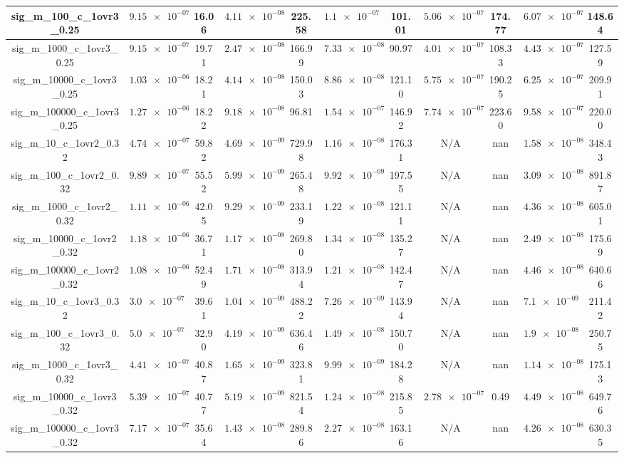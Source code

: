 \documentclass{article}%
\begin{document}
\begin{tabular}{|c||c|c|c|c|c|c|c|c|c|c|}
\hline%
sig\_m\_100\_c\_1ovr3\_0.25&$\num{9.15e-07}$&16.06&$\num{4.11e-08}$&225.58&$\num{1.1e-07}$&101.01&$\num{5.06e-07}$&174.77&$\num{6.07e-07}$&148.64\\%
\hline%
sig\_m\_1000\_c\_1ovr3\_0.25&$\num{9.15e-07}$&19.71&$\num{2.47e-08}$&166.99&$\num{7.33e-08}$&90.97&$\num{4.01e-07}$&108.33&$\num{4.43e-07}$&127.59\\%
\hline%
sig\_m\_10000\_c\_1ovr3\_0.25&$\num{1.03e-06}$&18.21&$\num{4.14e-08}$&150.03&$\num{8.86e-08}$&121.10&$\num{5.75e-07}$&190.25&$\num{6.25e-07}$&209.91\\%
\hline%
sig\_m\_100000\_c\_1ovr3\_0.25&$\num{1.27e-06}$&18.22&$\num{9.18e-08}$&96.81&$\num{1.54e-07}$&146.92&$\num{7.74e-07}$&223.60&$\num{9.58e-07}$&220.00\\%
\hline%
sig\_m\_10\_c\_1ovr2\_0.32&$\num{4.74e-07}$&59.82&$\num{4.69e-09}$&729.98&$\num{1.16e-08}$&176.31&N/A&nan&$\num{1.58e-08}$&348.43\\%
\hline%
sig\_m\_100\_c\_1ovr2\_0.32&$\num{9.89e-07}$&55.52&$\num{5.99e-09}$&265.48&$\num{9.92e-09}$&197.55&N/A&nan&$\num{3.09e-08}$&891.87\\%
\hline%
sig\_m\_1000\_c\_1ovr2\_0.32&$\num{1.11e-06}$&42.05&$\num{9.29e-09}$&233.19&$\num{1.22e-08}$&121.11&N/A&nan&$\num{4.36e-08}$&605.01\\%
\hline%
sig\_m\_10000\_c\_1ovr2\_0.32&$\num{1.18e-06}$&36.71&$\num{1.17e-08}$&269.80&$\num{1.34e-08}$&135.27&N/A&nan&$\num{2.49e-08}$&175.69\\%
\hline%
sig\_m\_100000\_c\_1ovr2\_0.32&$\num{1.08e-06}$&52.49&$\num{1.71e-08}$&313.94&$\num{1.21e-08}$&142.47&N/A&nan&$\num{4.46e-08}$&640.66\\%
\hline%
sig\_m\_10\_c\_1ovr3\_0.32&$\num{3.0e-07}$&39.61&$\num{1.04e-09}$&488.22&$\num{7.26e-09}$&143.94&N/A&nan&$\num{7.1e-09}$&211.42\\%
\hline%
sig\_m\_100\_c\_1ovr3\_0.32&$\num{5.0e-07}$&32.90&$\num{4.19e-09}$&636.46&$\num{1.49e-08}$&150.70&N/A&nan&$\num{1.9e-08}$&250.75\\%
\hline%
sig\_m\_1000\_c\_1ovr3\_0.32&$\num{4.41e-07}$&40.87&$\num{1.65e-09}$&323.81&$\num{9.99e-09}$&184.28&N/A&nan&$\num{1.14e-08}$&175.13\\%
\hline%
sig\_m\_10000\_c\_1ovr3\_0.32&$\num{5.39e-07}$&40.77&$\num{5.19e-09}$&821.54&$\num{1.24e-08}$&215.85&$\num{2.78e-07}$&0.49&$\num{4.49e-08}$&649.76\\%
\hline%
sig\_m\_100000\_c\_1ovr3\_0.32&$\num{7.17e-07}$&35.64&$\num{1.43e-08}$&289.86&$\num{2.27e-08}$&163.16&N/A&nan&$\num{4.26e-08}$&630.35\\%

\end{tabular}
\end{document}
